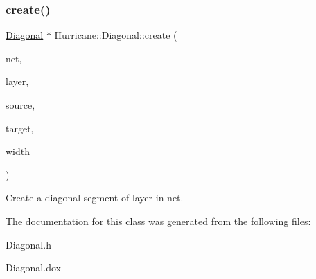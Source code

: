 \subsubsection{\texorpdfstring{create()}{create()}}
{\footnotesize\ttfamily \hyperlink{classHurricane_1_1Diagonal}{Diagonal} $\ast$ Hurricane\+::\+Diagonal\+::create (\begin{DoxyParamCaption}\item[{\hyperlink{classHurricane_1_1Net}{Net} $\ast$}]{net,  }\item[{const \hyperlink{classHurricane_1_1Layer}{Layer} $\ast$}]{layer,  }\item[{const \hyperlink{classHurricane_1_1Point}{Point} \&}]{source,  }\item[{const \hyperlink{classHurricane_1_1Point}{Point} \&}]{target,  }\item[{\hyperlink{group__DbUGroup_ga4fbfa3e8c89347af76c9628ea06c4146}{Db\+U\+::\+Unit}}]{width }\end{DoxyParamCaption})\hspace{0.3cm}{\ttfamily [static]}}

Create a diagonal segment of {\ttfamily layer} in {\ttfamily net}. 

The documentation for this class was generated from the following files\+:\begin{DoxyCompactItemize}
\item 
Diagonal.\+h\item 
Diagonal.\+dox\end{DoxyCompactItemize}
